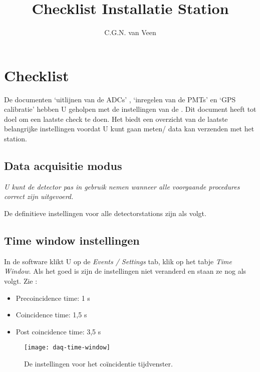 

\title{Checklist Installatie Station}
\author{C.G.N. van Veen}



\maketitle

\section{Checklist}
De documenten `uitlijnen van de ADCs' , `inregelen van de PMTs' en 
`GPS calibratie' hebben U geholpen met de instellingen van de \hisparc
\daq. Dit document heeft tot doel om een laatste check te doen. Het
biedt een overzicht van de laatste belangrijke instellingen voordat U kunt gaan
meten/ data kan verzenden met het \hisparc station. 

\subsection{Data acquisitie modus}

\emph{U kunt de detector pas in gebruik nemen wanneer alle voorgaande procedures correct zijn uitgevoerd.}

De definitieve instellingen voor alle \hisparc detectorstations zijn als volgt.

\subsection{Time window instellingen}

In de \daq software klikt U op de \emph{Events / Settings} tab, klik op het 
tabje \emph{Time Window}. Als het goed is zijn de instellingen niet veranderd 
en staan ze nog als volgt. Zie :

\begin{itemize}
    \item Precoincidence time: 1 \micro s
    \item Coincidence time: 1,5 \micro s
    \item Post coincidence time: 3,5 \micro s
\end{itemize}

\begin{figure}
    \centering
    \texttt{[image: daq-time-window]}
    \caption{De instellingen voor het coïncidentie tijdvenster.}
    \label{fig:daq-time-window}
\end{figure}


